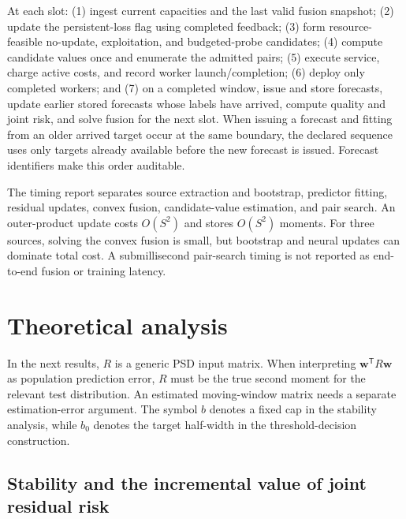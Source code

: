 At each slot: (1) ingest current capacities and the last valid fusion snapshot;
(2) update the persistent-loss flag using completed feedback;
(3) form resource-feasible no-update, exploitation, and budgeted-probe candidates;
(4) compute candidate values once and enumerate the admitted pairs;
(5) execute service, charge active costs, and record worker launch/completion;
(6) deploy only completed workers; and (7) on a completed window, issue and
store forecasts, update earlier stored forecasts whose labels have arrived,
compute quality and joint risk, and solve fusion for the next slot.
When issuing a forecast and fitting from an older arrived target occur at the
same boundary, the declared sequence uses only targets already available before
the new forecast is issued. Forecast identifiers make this order auditable.

The timing report separates source extraction and bootstrap, predictor fitting,
residual updates, convex fusion, candidate-value estimation, and pair search.
An outer-product update costs $O(S^2)$ and stores $O(S^2)$ moments. For three
sources, solving the convex fusion is small, but bootstrap and neural updates
can dominate total cost. A submillisecond pair-search timing is not reported as
end-to-end fusion or training latency.

\section{Theoretical analysis}
\label{sec:theory}
In the next results, $R$ is a generic PSD input matrix. When interpreting
$\boldsymbol w^{\mathsf T}R\boldsymbol w$ as population prediction error,
$R$ must be the true second moment for the relevant test distribution. An
estimated moving-window matrix needs a separate estimation-error argument.
The symbol $b$ denotes a fixed cap in the stability analysis, while $b_0$
denotes the target half-width in the threshold-decision construction.


\subsection{Stability and the incremental value of joint residual risk}
\label{sec:joint-risk-theory}


